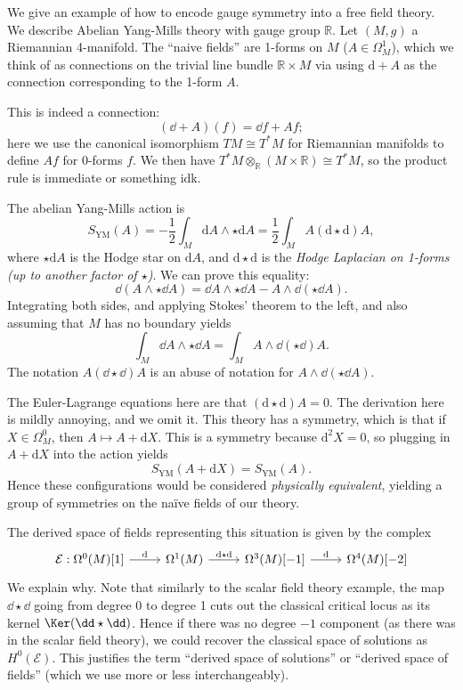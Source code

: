 \begin{example}\label{ex:4.3.8}
	We give an example of how to encode gauge symmetry into a free field theory. We describe Abelian Yang-Mills theory with gauge group $\mathbb{R} $. Let $(M,g)$ a Riemannian 4-manifold. The ``naive fields'' are 1-forms on $M$ ($A\in \Omega ^1_M$), which we think of as connections on the trivial line bundle $\mathbb{R} \times  M$ via using $\mathrm{d} +A$ as the connection corresponding to the 1-form $A$.

	This is indeed a connection:
	\[
		(\dd +A)(f) = \dd f + Af;
	\]
	here we use the canonical isomorphism $TM\cong T^*M$ for Riemannian manifolds to define $Af$ for 0-forms $f$. We then have $T^*M \otimes _\mathbb{R} (M\times \mathbb{R} ) \cong T^*M$, so the product rule is immediate or something idk.

	The abelian Yang-Mills action is
	\[
		S_{\mathrm{YM} } (A)=-\frac{1}{2} \int_{M} \mathrm{d} A\wedge \star \mathrm{d} A=\frac{1}{2} \int_{M} A(\mathrm{d} \star \mathrm{d} )A,
	\]
	where $\star \mathrm{d} A$ is the Hodge star on $\mathrm{d} A$, and $\mathrm{d} \star \mathrm{d} $ is the \emph{Hodge Laplacian on 1-forms (up to another factor of $\star $)}. We can prove this equality:
	\[
		\dd (A \wedge \star \dd A) = \dd A \wedge \star \dd A - A \wedge \dd (\star \dd A)
	.\]
	Integrating both sides, and applying Stokes' theorem to the left, and also assuming that $M$ has no boundary yields
	\[
		\int_{M} \dd A \wedge \star \dd A = \int_{M} A \wedge \dd (\star \dd )A
	.\]
	The notation $A(\dd \star \dd )A$ is an abuse of notation for $A\wedge \dd (\star \dd A)$.

	The Euler-Lagrange equations here are that $(\mathrm{d} \star \mathrm{d})A=0$. The derivation here is mildly annoying, and we omit it. This theory has a symmetry, which is that if $X\in\Omega ^0_M$, then $A\mapsto A+\mathrm{d} X$. This is a symmetry because $\mathrm{d} ^2X=0$, so plugging in $A+\mathrm{d} X$ into the action yields
	\[
		S_{\mathrm{YM} } (A+\mathrm{d} X)=S_{\mathrm{YM} } (A)
	.\]
	Hence these configurations would be considered \emph{physically equivalent}, yielding a group of symmetries on the na\"ive fields of our theory.

	The derived space of fields representing this situation is given by the complex
	\[\begin{tikzcd}[row sep = 2.5em, column sep = 2.5em]
		\mathcal{E} : \Omega ^0(M)[1]\ar[" \mathrm{d}  ", r]  & \Omega ^1(M)\ar[" \mathrm{d} \star \mathrm{d}  ", r]  & \Omega ^3(M)[-1]\ar[" \mathrm{d}  ", r] & \Omega ^4(M)[-2]
	\end{tikzcd}\]
	We explain why. Note that similarly to the scalar field theory example, the map $\dd \star \dd $ going from degree 0 to degree 1 cuts out the classical critical locus as its kernel $\Ker (\dd \star \dd )$. Hence if there was no degree $-1$ component (as there was in the scalar field theory), we could recover the classical space of solutions as $H^0(\mathcal{E} )$. This justifies the term ``derived space of solutions'' or ``derived space of fields'' (which we use more or less interchangeably).


\end{example}
